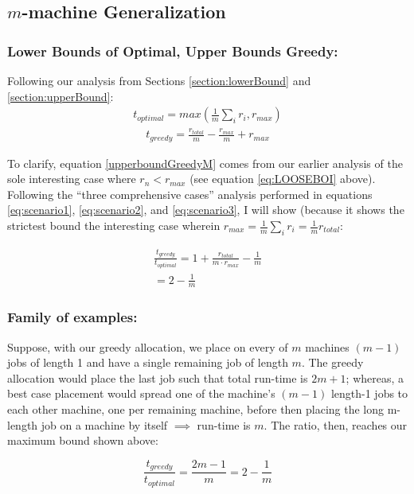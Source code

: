 \documentclass[conference]{styles/acmsiggraph}
\newcommand{\?}{\stackrel{?}{=}}
\begin{document}
\subsection{$m$-machine Generalization}

\subsubsection{Lower Bounds of Optimal, Upper Bounds Greedy:} 
Following our analysis from Sections \ref{section:lowerBound} and \ref{section:upperBound}:
\begin{align} \label{lowerboundOptM}
    t_{optimal} = max\left(\frac{1}{m} \sum_{i}r_i, r_{max}\right)
\end{align}
\begin{align} \label{upperboundGreedyM}
    t_{greedy} = \frac{r_{total}}{m}-\frac{r_{max}}{m} + r_{max}
\end{align}

To clarify, equation \ref{upperboundGreedyM} comes from our earlier analysis of the sole interesting case where $r_n < r_{max}$ (see equation \ref{eq:LOOSEBOI} above). Following the \enquote{three comprehensive cases} analysis performed in equations \ref{eq:scenario1}, \ref{eq:scenario2}, and \ref{eq:scenario3}, I will show (because it shows the strictest bound the interesting case wherein $r_{max} = \frac{1}{m} \sum_{i}r_i = \frac{1}{m} r_{total}$:

\begin{align} \label{eq:scenario1M}
    \frac{t_{greedy}}{t_{optimal}} = 1 + \frac{r_{total}}{m \cdot r_{max}} - \frac{1}{m}\\
    = 2 - \frac{1}{m}
\end{align}


\subsubsection{Family of examples:}
Suppose, with our greedy allocation, we place on every of $m$ machines $(m-1)$ jobs of length 1 and have a single remaining job of length $m$.  The greedy allocation would place the last job such that total run-time is $2m+1$; whereas, a best case placement would spread one of the machine's $(m-1)$ length-1 jobs to each other machine, one per remaining machine, before then placing the long m-length job on a machine by itself $\implies$ run-time is $m$.  The ratio, then, reaches our maximum bound shown above:

$$\frac{t_{greedy}}{t_{optimal}} = \frac{2m-1}{m} = 2 - \frac{1}{m}$$
\end{document}
